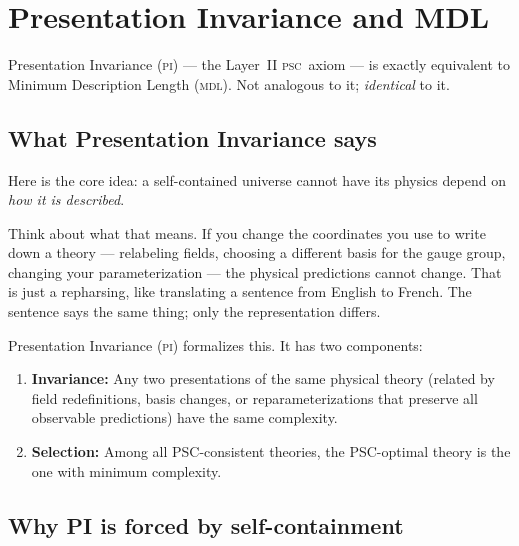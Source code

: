 \documentclass[11pt,a4paper]{article}
\newcommand{\PSC}{\textsc{psc}}
\newcommand{\MDL}{\textsc{mdl}}
\newcommand{\PI}{\textsc{pi}}
\begin{document}
\section{Presentation Invariance and MDL}
\label{sec:pi_mdl}

\begin{tcolorbox}[colback=boxblue,colframe=blue!40!black,
  title=The key identification]
Presentation Invariance (\PI) — the Layer~II \PSC\ axiom — is exactly equivalent
to Minimum Description Length (\MDL).  Not analogous to it; \emph{identical} to it.
\end{tcolorbox}

\subsection{What Presentation Invariance says}

Here is the core idea: a self-contained universe cannot have its physics depend on
\emph{how it is described}.

Think about what that means.  If you change the coordinates you use to write down a
theory — relabeling fields, choosing a different basis for the gauge group, changing
your parameterization — the physical predictions cannot change.  That is just a
repharsing, like translating a sentence from English to French.  The sentence says
the same thing; only the representation differs.

Presentation Invariance (\PI) formalizes this.  It has two components:

\begin{enumerate}[leftmargin=2em,itemsep=4pt]
\item \textbf{Invariance:} Any two presentations of the same physical theory (related
  by field redefinitions, basis changes, or reparameterizations that preserve all
  observable predictions) have the same complexity.

\item \textbf{Selection:} Among all PSC-consistent theories, the PSC-optimal theory
  is the one with minimum complexity.
\end{enumerate}

\subsection{Why PI is forced by self-containment}
\end{document}
